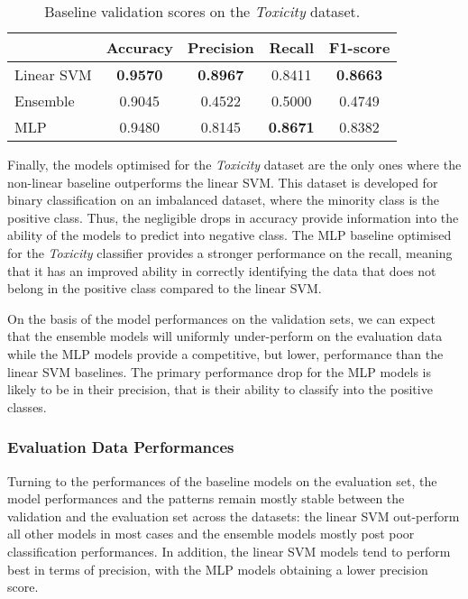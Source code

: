 \begin{table}[h]
  \centering
  \begin{tabular}{l|cccc}
                & Accuracy        & Precision       & Recall          & F1-score        \\ \hline
    Linear SVM  & \textbf{0.9570} & \textbf{0.8967} & 0.8411          & \textbf{0.8663}          \\
    Ensemble    & 0.9045          & 0.4522          & 0.5000          & 0.4749          \\
    MLP         & 0.9480          & 0.8145          & \textbf{0.8671} & 0.8382
  \end{tabular}
  \caption{Baseline validation scores on the \textit{Toxicity} dataset.}
  \label{tab:baseline_dev_wulczyn}
\end{table}

Finally, the models optimised for the \textit{Toxicity} dataset are the only ones where the non-linear baseline outperforms the linear SVM.
This dataset is developed for binary classification on an imbalanced dataset, where the minority class is the positive class.
Thus, the negligible drops in accuracy provide information into the ability of the models to predict into negative class.
The MLP baseline optimised for the \textit{Toxicity} classifier provides a stronger performance on the recall, meaning that it has an improved ability in correctly identifying the data that does not belong in the positive class compared to the linear SVM.

On the basis of the model performances on the validation sets, we can expect that the ensemble models will uniformly under-perform on the evaluation data while the MLP models provide a competitive, but lower, performance than the linear SVM baselines.
The primary performance drop for the MLP models is likely to be in their precision, that is their ability to classify into the positive classes.\vspace{5mm}

\subsubsection{Evaluation Data Performances}
Turning to the performances of the baseline models on the evaluation set, the model performances and the patterns remain mostly stable between the validation and the evaluation set across the datasets: the linear SVM out-perform all other models in most cases and the ensemble models mostly post poor classification performances.
In addition, the linear SVM models tend to perform best in terms of precision, with the MLP models obtaining a lower precision score.

